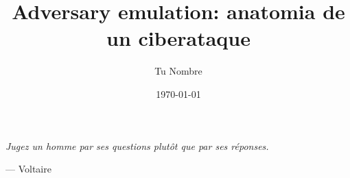 \documentclass[12pt,a4paper]{report}
\title{Adversary emulation: anatomia de un ciberataque}
\author{Tu Nombre}
\date{\today}
\begin{document}
\maketitle

\tableofcontents

\newpage
\epigraph{\textit{Jugez un homme par ses questions plutôt que par ses réponses.}}{--- Voltaire}








\end{document}
